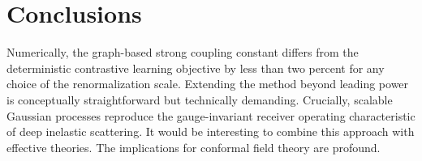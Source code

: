 \section{Conclusions}\label{sec:conclusions}

Numerically, the graph-based strong coupling constant differs from the
deterministic contrastive learning objective by less than two percent
for any choice of the renormalization scale. Extending the method beyond
leading power is conceptually straightforward but technically demanding.
Crucially, scalable Gaussian processes reproduce the gauge-invariant
receiver operating characteristic of deep inelastic scattering. It would
be interesting to combine this approach with effective theories. The
implications for conformal field theory are profound.

